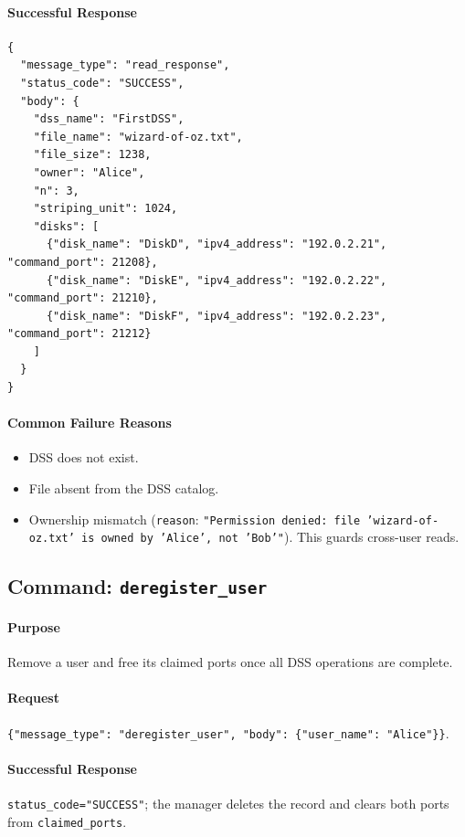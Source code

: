\documentclass[11pt]{article}
\begin{document}
\paragraph{Successful Response}
\begin{verbatim}
{
  "message_type": "read_response",
  "status_code": "SUCCESS",
  "body": {
    "dss_name": "FirstDSS",
    "file_name": "wizard-of-oz.txt",
    "file_size": 1238,
    "owner": "Alice",
    "n": 3,
    "striping_unit": 1024,
    "disks": [
      {"disk_name": "DiskD", "ipv4_address": "192.0.2.21", "command_port": 21208},
      {"disk_name": "DiskE", "ipv4_address": "192.0.2.22", "command_port": 21210},
      {"disk_name": "DiskF", "ipv4_address": "192.0.2.23", "command_port": 21212}
    ]
  }
}
\end{verbatim}

\paragraph{Common Failure Reasons}
\begin{itemize}
  \item DSS does not exist.
  \item File absent from the DSS catalog.
  \item Ownership mismatch (\texttt{reason}: \texttt{"Permission denied: file 'wizard-of-oz.txt' is owned by 'Alice', not 'Bob'"}). This guards cross-user reads.
\end{itemize}

\subsection{Command: \texttt{deregister\_user}}
\paragraph{Purpose} Remove a user and free its claimed ports once all DSS operations are complete.

\paragraph{Request} \texttt{\{"message\_type": "deregister\_user", "body": \{"user\_name": "Alice"\}\}}.

\paragraph{Successful Response} \texttt{status\_code="SUCCESS"}; the manager deletes the record and clears both ports from \texttt{claimed\_ports}.
\end{document}
